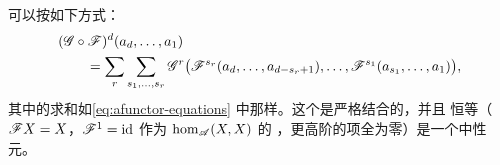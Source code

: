 \trNonunital{}\trAFunctor{}可以按如下方式\trComposition：
\begin{equation}\label{eq:afunctor-composition}
\begin{split}
&(\mathscr{G}\circ\mathscr{F})^d(a_d,\ldots,a_1)
\\
&\hspace{2em}=\sum_r\sum_{s_1,\ldots,s_r}\mathscr{G}^r
\bigl(\mathscr{F}^{s_r}(a_d,\ldots,a_{d-s_r+1}),\ldots,\mathscr{F}^{s_1}(a_{s_1},\ldots,a_1)\bigr),
\end{split}
\end{equation}
其中的求和如\eqref{eq:afunctor-equations} 中那样。这个\trComposition{}是严格结合的，并且
恒等\trFunctor{}（$\mathscr{F}X=X$，$\mathscr{F}^1=\mathrm{id}$ 作为 $\hom_{\mathscr{A}}(X,X)$ 的%
\trEndomorphism，更高阶的项全为零）是一个中性元。
